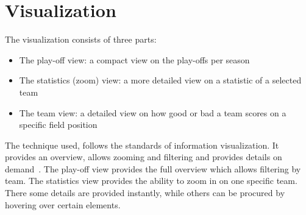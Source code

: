 \documentclass[]{sigchi}
\begin{document}





\section{Visualization}\label{sec:visualization}
The visualization consists of three parts:
\begin{itemize}
    \item The play-off view: a compact view on the play-offs per season
    \item The statistics (zoom) view: a more detailed view on a statistic of a
        selected team
    \item The team view: a detailed view on how good or bad a team scores on a
        specific field position
\end{itemize}

The technique used, follows the standards of information visualization. It provides
an overview, allows zooming and filtering and provides details on
demand~\cite{mantra,multipleviews}. The play-off view provides
the full overview which allows filtering by team. The statistics view provides
the ability to zoom in on one specific team. There some details are provided
instantly, while others can be procured by hovering over certain elements.
\end{document}
